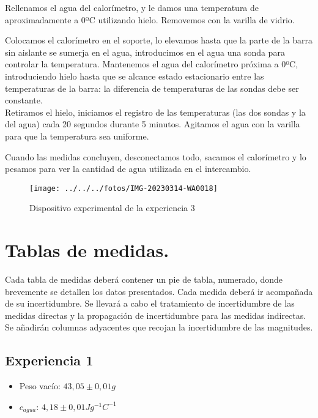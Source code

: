 \documentclass[a4paper,12pt,spanish]{article}
\begin{document}
	Rellenamos el agua del calorímetro, y le damos una temperatura de aproximadamente a 0ºC utilizando hielo. Removemos con la varilla de vidrio.
	
	Colocamos el calorímetro en el soporte, lo elevamos hasta que la parte de la barra sin aislante se sumerja en el agua, introducimos en el agua una sonda para controlar la temperatura. Mantenemos el agua del calorímetro próxima a 0ºC, introduciendo hielo hasta que se alcance estado estacionario entre las temperaturas de la barra: la diferencia de temperaturas de las sondas debe ser constante.\\
	
	Retiramos el hielo, iniciamos el registro de las temperaturas (las dos sondas y la del agua) cada 20 segundos durante 5 minutos. Agitamos el agua con la varilla para que la temperatura sea uniforme. 
	
	Cuando las medidas concluyen, desconectamos todo, sacamos el calorímetro y lo pesamos para ver la cantidad de agua utilizada en el intercambio.
	
	
	
	
	
\begin{figure}[H]
	\centering
	\texttt{[image: ../../../fotos/IMG-20230314-WA0018]}
	\caption{Dispositivo experimental de la experiencia 3}
	\label{fig:img-20230314-wa0018}
\end{figure}
	
	
	\section{Tablas de medidas.}
	
	Cada tabla de medidas deberá contener un pie de tabla,
	numerado, donde brevemente se detallen los datos presentados. Cada medida
	deberá ir acompañada de su incertidumbre. Se llevará a cabo el tratamiento de
	incertidumbre de las medidas directas y la propagación de incertidumbre para las
	medidas indirectas. Se añadirán columnas adyacentes que recojan la
	incertidumbre de las magnitudes.
	
	\subsection{Experiencia 1}%
	
	\begin{itemize}
		\item Peso vacío: $43,05 \pm 0,01 \si{g}$
		\item $c_{agua}$: $4,18\pm 0,01 \si{Jg^{-1}C^{-1}}$
	\end{itemize}
\end{document}
